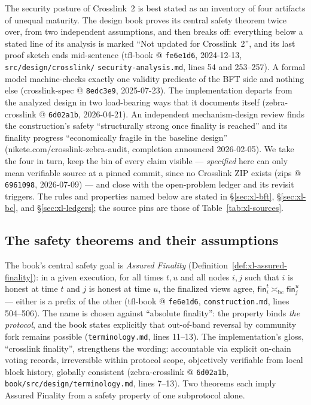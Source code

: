 \documentclass[11pt,a4paper]{article}
\theoremstyle{definition}
\begin{document}
The security posture of Crosslink~2 is best stated as an inventory of four
artifacts of unequal maturity. The design book proves its central safety
theorem twice over, from two independent assumptions, and then breaks off:
everything below a stated line of its analysis is marked ``Not updated for
Crosslink~2'', and its last proof sketch ends mid-sentence (tfl-book @
\texttt{fe6e1d6}, 2024-12-13, \texttt{src/design/crosslink/}%
\texttt{security-analysis.md}, lines 54 and 253--257). A formal model
machine-checks exactly one validity predicate of the BFT side and nothing
else (crosslink-spec @ \texttt{8edc3e9}, 2025-07-23). The implementation
departs from the analyzed design in two load-bearing ways that it documents
itself (zebra-crosslink @ \texttt{6d02a1b}, 2026-04-21). An independent
mechanism-design review finds the construction's safety ``structurally
strong once finality is reached'' and its finality progress ``economically
fragile in the baseline design'' (nikete.com/crosslink-zebra-audit,
completion announced 2026-02-05). We take the four in turn, keep the bin of
every claim visible --- \emph{specified} here can only mean verifiable
source at a pinned commit, since no Crosslink ZIP exists (zips @
\texttt{6961098}, 2026-07-09) --- and close with the open-problem ledger
and its revisit triggers. The rules and properties named below are
stated in \S\ref{sec:xl-bft}, \S\ref{sec:xl-bc}, and
\S\ref{sec:xl-ledgers}; the source pins are those of
Table~\ref{tab:xl-sources}.

\subsection{The safety theorems and their assumptions}
\label{sec:xl-safety-theorems}

The book's central safety goal is \emph{Assured Finality}
(Definition~\ref{def:xl-assured-finality}): in a given
execution, for all times $t, u$ and all nodes $i, j$ such that $i$ is
honest at time $t$ and $j$ is honest at time $u$, the finalized views
agree, $\mathsf{fin}_i^t \asymp_{\mathrm{bc}} \mathsf{fin}_j^u$ --- either
is a prefix of the other (tfl-book @ \texttt{fe6e1d6},
\texttt{construction.md}, lines 504--506). The name is chosen against
``absolute finality'': the property binds \emph{the protocol}, and the
book states explicitly that out-of-band reversal by community fork remains
possible (\texttt{terminology.md}, lines 11--13). The implementation's
gloss, ``crosslink finality'', strengthens the wording: accountable via
explicit on-chain voting records, irreversible within protocol scope,
objectively verifiable from local block history, globally consistent
(zebra-crosslink @ \texttt{6d02a1b},
\texttt{book/src/design/terminology.md}, lines 7--13). Two theorems each
imply Assured Finality from a safety property of one subprotocol alone.
\end{document}
